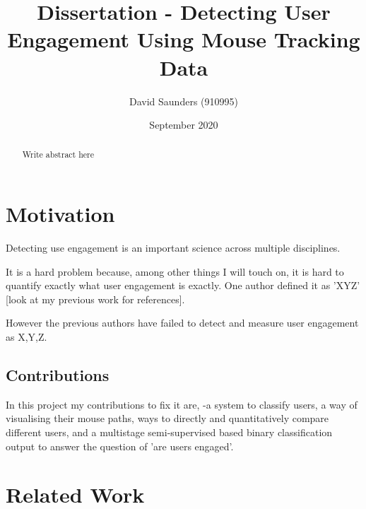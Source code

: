 \documentclass{article}
\title{Dissertation - Detecting User Engagement Using Mouse Tracking Data}
\author{David Saunders (910995)}
\date{September 2020}
\begin{document}
\maketitle

\begin{abstract} 
    Write abstract here
\end{abstract}

\tableofcontents



\section{Motivation}


Detecting use engagement is an important science across multiple disciplines.

It is a hard problem because, among other things I will touch on, it is hard to quantify exactly what user engagement is exactly.
One author defined it as 'XYZ' [look at my previous work for references].

However the previous authors have failed to detect and measure user engagement as X,Y,Z.

\subsection{Contributions}

In this project my contributions to fix it are, -a system to classify users, a way of visualising their mouse paths, ways to directly and quantitatively compare different users, and a multistage semi-supervised based binary classification output to answer the question of 'are users engaged'.

\section{Related Work}

\end{document}
